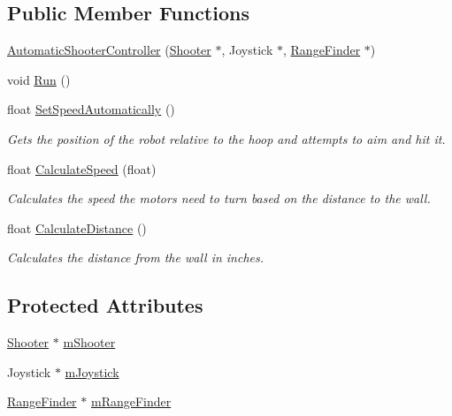 \subsection*{\-Public \-Member \-Functions}
\begin{DoxyCompactItemize}
\item 
\hyperlink{class_automatic_shooter_controller_ace4ef4e2d3a388b273b8b05be12abc28}{\-Automatic\-Shooter\-Controller} (\hyperlink{class_shooter}{\-Shooter} $\ast$, \-Joystick $\ast$, \hyperlink{class_range_finder}{\-Range\-Finder} $\ast$)
\item 
void \hyperlink{class_automatic_shooter_controller_a48012fe23490c41b0b8654147764f838}{\-Run} ()
\item 
float \hyperlink{class_automatic_shooter_controller_ade48e6198578a2f8234fb9cac9b9dc31}{\-Set\-Speed\-Automatically} ()
\begin{DoxyCompactList}\small\item\em \-Gets the position of the robot relative to the hoop and attempts to aim and hit it. \end{DoxyCompactList}\item 
float \hyperlink{class_automatic_shooter_controller_a70e43da69046d53556c6738e6a1be93f}{\-Calculate\-Speed} (float)
\begin{DoxyCompactList}\small\item\em \-Calculates the speed the motors need to turn based on the distance to the wall. \end{DoxyCompactList}\item 
float \hyperlink{class_automatic_shooter_controller_ab5a52a59dcb9957de5a20d5ddd9f5303}{\-Calculate\-Distance} ()
\begin{DoxyCompactList}\small\item\em \-Calculates the distance from the wall in inches. \end{DoxyCompactList}\end{DoxyCompactItemize}
\subsection*{\-Protected \-Attributes}
\begin{DoxyCompactItemize}
\item 
\hyperlink{class_shooter}{\-Shooter} $\ast$ \hyperlink{class_automatic_shooter_controller_aa227a7071f58aef7e30521fa563eebb0}{m\-Shooter}
\item 
\-Joystick $\ast$ \hyperlink{class_automatic_shooter_controller_a165a8c597fbcee1444fbcd7480f531ee}{m\-Joystick}
\item 
\hyperlink{class_range_finder}{\-Range\-Finder} $\ast$ \hyperlink{class_automatic_shooter_controller_a78b436c9b1d561a3b370d17bb73dbdef}{m\-Range\-Finder}
\end{DoxyCompactItemize}
